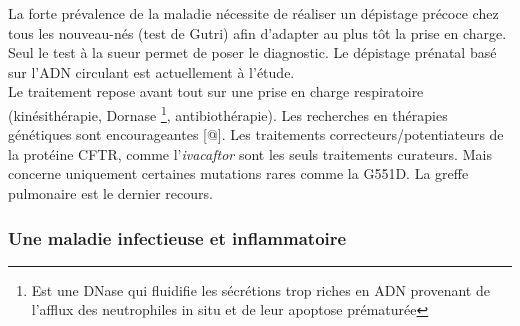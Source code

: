 \documentclass[12pt,a4paper]{article}
\begin{document}
La forte prévalence de la maladie nécessite de réaliser un dépistage précoce chez tous les nouveau-nés (test de Gutri) afin d’adapter au plus tôt la prise en charge. Seul le test à la sueur permet de poser le diagnostic. Le dépistage prénatal basé sur l’ADN circulant est actuellement à l’étude.\\   
Le traitement repose avant tout sur une prise en charge respiratoire (kinésithérapie, Dornase \footnote{Est une DNase qui fluidifie les sécrétions trop riches en ADN provenant de l'afflux des neutrophiles in situ et de leur apoptose prématurée}, antibiothérapie). Les recherches en thérapies génétiques sont encourageantes [@].
Les traitements correcteurs/potentiateurs de la protéine CFTR, comme l'\textit{ivacaftor} sont les seuls traitements curateurs. Mais concerne uniquement certaines mutations rares comme la G551D. La greffe pulmonaire est le dernier recours.

\subsubsection{Une maladie infectieuse et inflammatoire}
\end{document}
